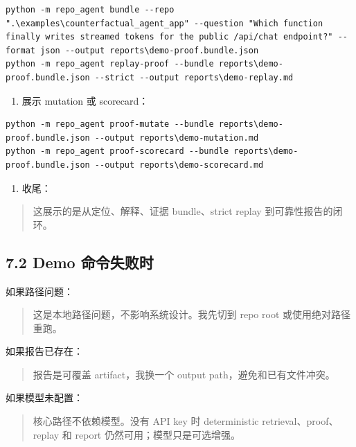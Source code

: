 \documentclass[UTF8,12pt,openany]{ctexbook}
\begin{document}
\begin{lstlisting}
python -m repo_agent bundle --repo ".\examples\counterfactual_agent_app" --question "Which function finally writes streamed tokens for the public /api/chat endpoint?" --format json --output reports\demo-proof.bundle.json
python -m repo_agent replay-proof --bundle reports\demo-proof.bundle.json --strict --output reports\demo-replay.md
\end{lstlisting}

\begin{enumerate}
\item 展示 mutation 或 scorecard：
\end{enumerate}

\begin{lstlisting}
python -m repo_agent proof-mutate --bundle reports\demo-proof.bundle.json --output reports\demo-mutation.md
python -m repo_agent proof-scorecard --bundle reports\demo-proof.bundle.json --output reports\demo-scorecard.md
\end{lstlisting}

\begin{enumerate}
\item 收尾：
\end{enumerate}

\begin{quote}
这展示的是从定位、解释、证据 bundle、strict replay 到可靠性报告的闭环。
\end{quote}

\subsection{7.2 Demo 命令失败时}

如果路径问题：\par

\begin{quote}
这是本地路径问题，不影响系统设计。我先切到 repo root 或使用绝对路径重跑。
\end{quote}

如果报告已存在：\par

\begin{quote}
报告是可覆盖 artifact，我换一个 output path，避免和已有文件冲突。
\end{quote}

如果模型未配置：\par

\begin{quote}
核心路径不依赖模型。没有 API key 时 deterministic retrieval、proof、replay 和 report 仍然可用；模型只是可选增强。
\end{quote}
\end{document}
